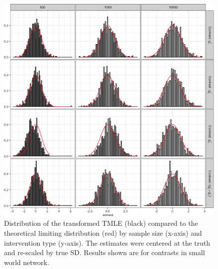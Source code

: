 \documentclass[english]{article}\usepackage[]{graphicx}\usepackage[]{color}
\makeatletter
\def\maxwidth{ %
  \ifdim\Gin@nat@width>\linewidth
    \linewidth
  \else
    \Gin@nat@width
  \fi
}
\newenvironment{knitrout}{}{} %
\theoremstyle{plain}
\theoremstyle{plain}
\makeatother
\begin{document}
\begin{knitrout}\footnotesize
{}\color{fgcolor}\begin{figure}

{\centering \includegraphics[width=\maxwidth]{TablesFigs/knitR-hist_TMLE_ATE_smwld-1} 

}

\caption[Distribution of the transformed TMLE (black) compared to the theoretical limiting distribution (red) by sample size (x-axis) and intervention type (y-axis)]{Distribution of the transformed TMLE (black) compared to the theoretical limiting distribution (red) by sample size (x-axis) and intervention type (y-axis). The estimates were centered at the truth and re-scaled by true SD. Results shown are for contrasts in small world network.}\label{fig:hist.TMLE.ATE.smwld}
\end{figure}


\end{knitrout}
\end{document}
